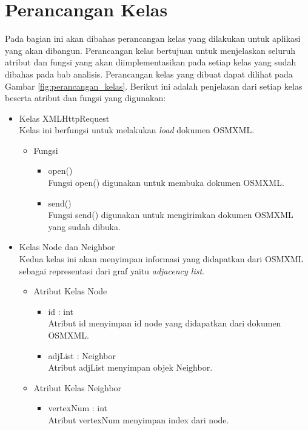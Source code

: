 \section{Perancangan Kelas}
Pada bagian ini akan dibahas perancangan kelas yang dilakukan untuk aplikasi
yang akan dibangun. Perancangan kelas bertujuan untuk menjelaskan
seluruh atribut dan fungsi yang akan diimplementasikan pada setiap kelas
yang sudah dibahas pada bab analisis. Perancangan kelas yang dibuat dapat 
dilihat pada Gambar \ref{fig:perancangan_kelas}. Berikut ini adalah penjelasan
dari setiap kelas beserta atribut dan fungsi yang digunakan:
\begin{itemize}
  \item Kelas XMLHttpRequest\\
  Kelas ini berfungsi untuk melakukan \textit{load} dokumen OSMXML.
  \begin{itemize}
    \item Fungsi
    \begin{itemize}
      \item open()\\
      Fungsi open() digunakan untuk membuka dokumen OSMXML.
      
      \item send()\\
      Fungsi send() digunakan untuk mengirimkan dokumen OSMXML yang sudah
      dibuka.
    \end{itemize}
  \end{itemize}
  
  \item Kelas Node dan Neighbor\\
  Kedua kelas ini akan menyimpan informasi yang didapatkan dari OSMXML sebagai
  representasi dari graf yaitu \textit{adjacency list}.
  \begin{itemize}
    \item Atribut Kelas Node
    \begin{itemize}
      \item id : int\\
      Atribut id menyimpan id node yang didapatkan dari dokumen OSMXML.
      
      \item adjList : Neighbor\\
      Atribut adjList menyimpan objek Neighbor.
    \end{itemize}
  \end{itemize}
  \begin{itemize}
    \item Atribut Kelas Neighbor
    \begin{itemize}
      \item vertexNum : int\\
      Atribut vertexNum menyimpan index dari node.
      

\end{itemize}
\end{itemize}
\end{itemize}
